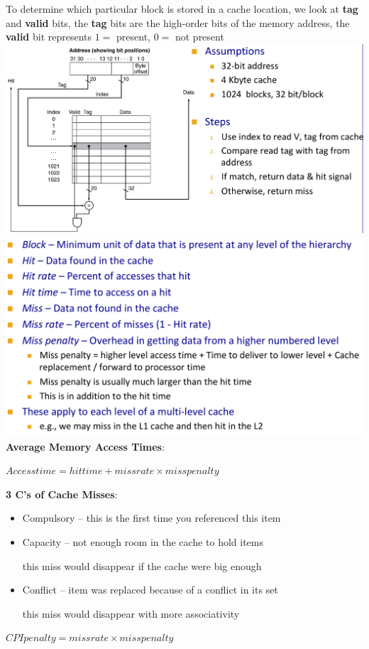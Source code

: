 To determine which particular block is stored in a cache location, we look at
\textbf{tag} and \textbf{valid} bits, the \textbf{tag} bits are the high-order
bits of the memory address, the \textbf{valid} bit represents $1 =$ present,
$0 =$ not present
\includegraphics[width=\linewidth]{png/cache.png}
\includegraphics[width=\linewidth]{png/term.png}
\textbf{Average Memory Access Times}:

$Access time = hit time + miss rate \times miss penalty$

\textbf{3 C's of Cache Misses}:
\begin{itemize}
\item Compulsory – this is the first time you referenced this item
\item Capacity – not enough room in the cache to hold items
\par this miss would disappear if the cache were big enough
\item Conflict – item was replaced because of a conflict in its set
\par this miss would disappear with more associativity
\end{itemize}
$CPI penalty = miss rate \times miss penalty$

